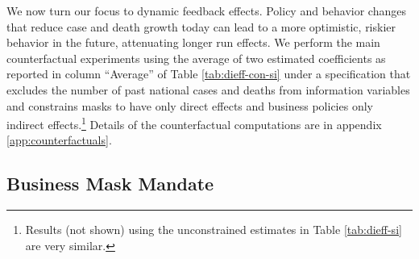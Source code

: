 \documentclass[11pt,reqno,letter]{amsart}
\theoremstyle{definition}
\begin{document}
We now turn our focus to dynamic feedback effects. Policy and behavior
changes that reduce case and death growth today can lead to a more
optimistic, riskier behavior in the future, attenuating longer run
effects.  We perform the main counterfactual experiments using the
average of two estimated coefficients as reported in column
``Average'' of Table \ref{tab:dieff-con-si} under a specification that
excludes the number of past national cases and deaths from information
variables and constrains masks to have only direct effects and
business policies only indirect effects.\footnote{Results (not shown)
  using the unconstrained estimates in Table \ref{tab:dieff-si} are
  very similar.} Details of the counterfactual computations are in
appendix \ref{app:counterfactuals}.

\subsection{Business Mask Mandate}
\end{document}
